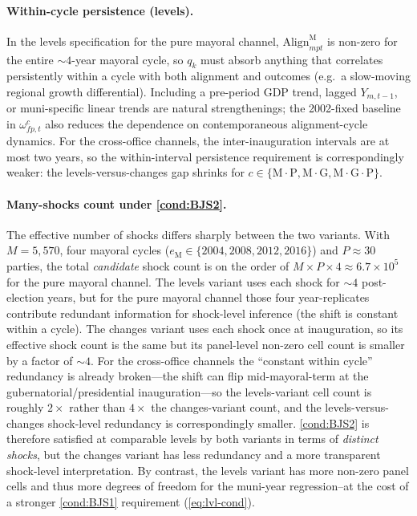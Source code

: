 \documentclass{article}
\newcommand{\Align}{\mathrm{Align}}
\theoremstyle{plain}
\theoremstyle{definition}
\theoremstyle{remark}
\begin{document}
\paragraph{Within-cycle persistence (levels).}
In the levels specification for the pure mayoral channel,
$\Align^{\mathrm{M}}_{mpt}$ is non-zero for the entire $\sim 4$-year
mayoral cycle, so $q_k$ must absorb anything that correlates persistently
within a cycle with both alignment and outcomes (e.g.\ a slow-moving
regional growth differential). Including a pre-period GDP trend, lagged
$Y_{m,t-1}$, or muni-specific linear trends are natural strengthenings;
the 2002-fixed baseline in $\omega^{c}_{fp,t}$ also reduces the
dependence on contemporaneous alignment-cycle dynamics. For the cross-office
channels, the inter-inauguration intervals are at most two years, so the
within-interval persistence requirement is correspondingly weaker: the
levels-versus-changes gap shrinks for $c\in\{\mathrm{M{\cdot}P},
\mathrm{M{\cdot}G},\mathrm{M{\cdot}G{\cdot}P}\}$.

\paragraph{Many-shocks count under \autoref{cond:BJS2}.}
The effective number of shocks differs sharply between the two variants.
With $M=5{,}570$, four mayoral cycles
($e_{\mathrm{M}}\in\{2004,2008,2012,2016\}$) and $P\approx 30$ parties,
the total \emph{candidate} shock count is on the order of $M\times P\times
4\approx 6.7\times 10^{5}$ for the pure mayoral channel. The levels
variant uses each shock for $\sim 4$ post-election years, but for the
pure mayoral channel those four year-replicates contribute redundant
information for shock-level inference (the shift is constant within a
cycle). The changes variant uses each shock once at inauguration, so its
effective shock count is the same but its panel-level non-zero cell count
is smaller by a factor of $\sim 4$. For the cross-office channels the
``constant within cycle'' redundancy is already broken---the shift can
flip mid-mayoral-term at the gubernatorial/presidential
inauguration---so the levels-variant cell count is roughly $2\times$
rather than $4\times$ the changes-variant count, and the levels-versus-changes
shock-level redundancy is correspondingly smaller.
\autoref{cond:BJS2} is therefore satisfied at comparable levels by both
variants in terms of \emph{distinct shocks}, but the changes variant has less
redundancy and a more transparent shock-level interpretation. By contrast, the
levels variant has more non-zero panel cells and thus more degrees of freedom
for the muni-year regression--at the cost of a stronger \autoref{cond:BJS1}
requirement (\eqref{eq:lvl-cond}).
\end{document}

